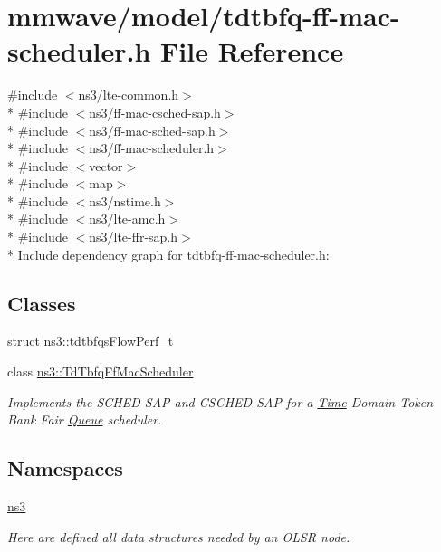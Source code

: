 \hypertarget{mmwave_2model_2tdtbfq-ff-mac-scheduler_8h}{}\section{mmwave/model/tdtbfq-\/ff-\/mac-\/scheduler.h File Reference}
\label{mmwave_2model_2tdtbfq-ff-mac-scheduler_8h}
{\ttfamily \#include $<$ns3/lte-\/common.\+h$>$}\\*
{\ttfamily \#include $<$ns3/ff-\/mac-\/csched-\/sap.\+h$>$}\\*
{\ttfamily \#include $<$ns3/ff-\/mac-\/sched-\/sap.\+h$>$}\\*
{\ttfamily \#include $<$ns3/ff-\/mac-\/scheduler.\+h$>$}\\*
{\ttfamily \#include $<$vector$>$}\\*
{\ttfamily \#include $<$map$>$}\\*
{\ttfamily \#include $<$ns3/nstime.\+h$>$}\\*
{\ttfamily \#include $<$ns3/lte-\/amc.\+h$>$}\\*
{\ttfamily \#include $<$ns3/lte-\/ffr-\/sap.\+h$>$}\\*
Include dependency graph for tdtbfq-\/ff-\/mac-\/scheduler.h\+:
\subsection*{Classes}
\begin{DoxyCompactItemize}
\item 
struct \hyperlink{structns3_1_1tdtbfqsFlowPerf__t}{ns3\+::tdtbfqs\+Flow\+Perf\+\_\+t}
\item 
class \hyperlink{classns3_1_1TdTbfqFfMacScheduler}{ns3\+::\+Td\+Tbfq\+Ff\+Mac\+Scheduler}
\begin{DoxyCompactList}\small\item\em Implements the S\+C\+H\+ED S\+AP and C\+S\+C\+H\+ED S\+AP for a \hyperlink{classns3_1_1Time}{Time} Domain Token Bank Fair \hyperlink{classns3_1_1Queue}{Queue} scheduler. \end{DoxyCompactList}\end{DoxyCompactItemize}
\subsection*{Namespaces}
\begin{DoxyCompactItemize}
\item 
 \hyperlink{namespacens3}{ns3}
\begin{DoxyCompactList}\small\item\em Here are defined all data structures needed by an O\+L\+SR node. \end{DoxyCompactList}\end{DoxyCompactItemize}
